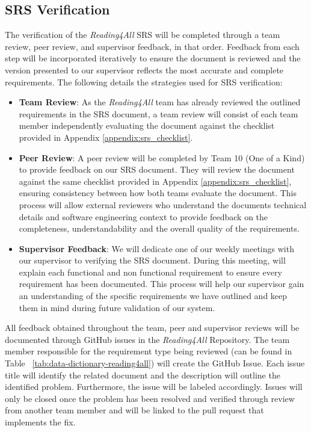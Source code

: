 \documentclass[12pt, titlepage]{article}
\begin{document}
  
\subsection{SRS Verification}
The verification of the \textit{Reading4All} SRS will be completed
through a team review, peer review, and supervisor feedback, in that order.
Feedback from each step will be incorporated iteratively to ensure
the document is reviewed and the version presented to our supervisor
reflects the most accurate and complete requirements. The following details the 
strategies used for SRS verification: 

\begin{itemize}
  \item \textbf{Team Review}:
  As the \textit{Reading4All} team has already reviewed the outlined
  requirements in the SRS document, a team review will
  consist of each team member independently evaluating the document
  against the checklist provided in Appendix \ref{appendix:srs_checklist}.  
  
  \item \textbf{Peer Review}:
  A peer review will be completed by Team 10 (One of a Kind) to provide
  feedback on our SRS document.
  They will review the document against the same checklist provided in
  Appendix \ref{appendix:srs_checklist}, ensuring consistency between
  how both teams evaluate the document.
  This process will allow external reviewers who understand the
  documents technical details and software engineering context to
  provide feedback on the completeness, understandability and the
  overall quality of the requirements. 
  
  \item \textbf{Supervisor Feedback}:
  We will dedicate one of our weekly meetings with our supervisor to
  verifying the SRS document.
  During this meeting, will explain each functional and non functional
  requirement to ensure every requirement has been documented.
  This process will help our supervisor gain an understanding of the
  specific requirements we have outlined and keep them in
  mind during future validation of our system. 
\end{itemize}
All feedback obtained throughout the team, peer and supervisor reviews will be documented through GitHub issues in the \textit{Reading4All} Repository. 
The team member responsible for the requirement type being reviewed (can be found in Table ~\ref{tab:data-dictionary-reading4all}) will create the GitHub Issue. 
Each issue title will identify the related document and the description will outline the identified problem. Furthermore, the issue will be labeled accordingly. 
Issues will only be closed once the problem has been resolved and verified through review from another team member and will be linked to the pull request that implements the fix.  
\end{document}
